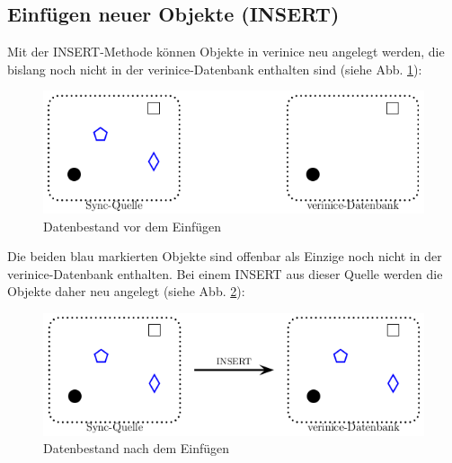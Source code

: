 \documentclass[a4paper,10pt]{book}
\begin{document}
\subsection{Einfügen neuer Objekte (INSERT)}
Mit der \textsc{INSERT}-Methode können Objekte in verinice neu angelegt werden, die bislang noch nicht in der
verinice-Datenbank enthalten sind (siehe Abb. \ref{Datenbestand vor dem Einfuegen}):
\newline
\begin{figure}[htb!]
  \centering
  \includegraphics[scale=.7]{Screenshot/SyncAPI_pre_INSERT.png}
  \caption{\label{Datenbestand vor dem Einfuegen} Datenbestand vor dem Einfügen}
\end{figure}
\newline
Die beiden blau markierten Objekte sind offenbar als Einzige noch nicht in der verinice-Datenbank
enthalten. Bei einem \textsc{INSERT} aus dieser Quelle werden die Objekte daher neu angelegt (siehe Abb. \ref{Datenbestand nach dem Einfuegen}):
\newline
\begin{figure}[htb!]
  \centering
  \includegraphics[scale=.7]{Screenshot/SyncAPI_post_INSERT.png}
  \caption{\label{Datenbestand nach dem Einfuegen} Datenbestand nach dem Einfügen}
\end{figure}
\newline
\end{document}
